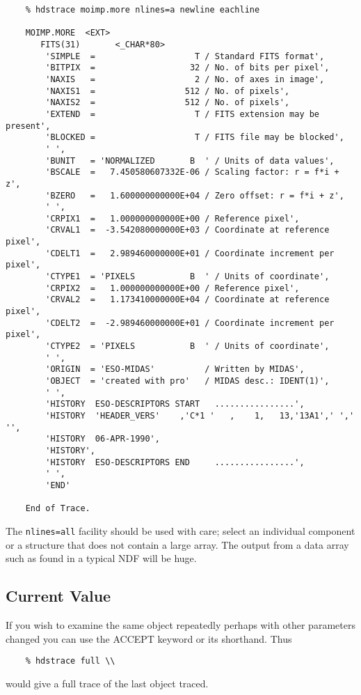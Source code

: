 \small
\begin{verbatim}
    % hdstrace moimp.more nlines=a newline eachline

    MOIMP.MORE  <EXT>
       FITS(31)       <_CHAR*80>
        'SIMPLE  =                    T / Standard FITS format',
        'BITPIX  =                   32 / No. of bits per pixel',
        'NAXIS   =                    2 / No. of axes in image',
        'NAXIS1  =                  512 / No. of pixels',
        'NAXIS2  =                  512 / No. of pixels',
        'EXTEND  =                    T / FITS extension may be present',
        'BLOCKED =                    T / FITS file may be blocked',
        ' ',
        'BUNIT   = 'NORMALIZED       B  ' / Units of data values',
        'BSCALE  =   7.450580607332E-06 / Scaling factor: r = f*i + z',
        'BZERO   =   1.600000000000E+04 / Zero offset: r = f*i + z',
        ' ',
        'CRPIX1  =   1.000000000000E+00 / Reference pixel',
        'CRVAL1  =  -3.542080000000E+03 / Coordinate at reference pixel',
        'CDELT1  =   2.989460000000E+01 / Coordinate increment per pixel',
        'CTYPE1  = 'PIXELS           B  ' / Units of coordinate',
        'CRPIX2  =   1.000000000000E+00 / Reference pixel',
        'CRVAL2  =   1.173410000000E+04 / Coordinate at reference pixel',
        'CDELT2  =  -2.989460000000E+01 / Coordinate increment per pixel',
        'CTYPE2  = 'PIXELS           B  ' / Units of coordinate',
        ' ',
        'ORIGIN  = 'ESO-MIDAS'          / Written by MIDAS',
        'OBJECT  = 'created with pro'   / MIDAS desc.: IDENT(1)',
        ' ',
        'HISTORY  ESO-DESCRIPTORS START   ................',
        'HISTORY  'HEADER_VERS'    ,'C*1 '   ,    1,   13,'13A1',' ',' '',
        'HISTORY  06-APR-1990',
        'HISTORY',
        'HISTORY  ESO-DESCRIPTORS END     ................',
        ' ',
        'END'

    End of Trace.
\end{verbatim}
\normalsize
The {\tt nlines=all} facility should be used with care; select an individual
component or a structure that does not contain a large array.  The
output from a data array such as found in a typical NDF will be huge.

\subsection{Current Value}

If you wish to examine the same object repeatedly perhaps with other
parameters changed you can use the ACCEPT keyword or its shorthand.
Thus
\small
\begin{verbatim}
    % hdstrace full \\
\end{verbatim}
\normalsize
would give a full trace of the last object traced.

